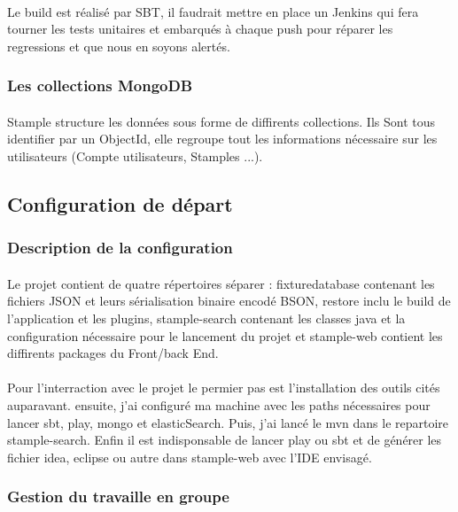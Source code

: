 \documentclass[11pt]{article} %
\begin{document}
\paragraph{}
Le build est réalisé par SBT, il faudrait mettre en place un Jenkins qui fera tourner les tests unitaires et embarqués à chaque push pour réparer les regressions et que nous en soyons alertés.
\subsubsection{Les collections MongoDB}
\paragraph{}
Stample structure les données sous forme de diffirents collections.
Ils Sont tous identifier par un ObjectId, elle regroupe tout les informations nécessaire sur les utilisateurs (Compte utilisateurs, Stamples ...).
\subsection{Configuration de départ}
\subsubsection{Description de la configuration}
\paragraph{}
Le projet contient de quatre répertoires séparer : fixturedatabase contenant les fichiers JSON et leurs sérialisation binaire encodé BSON, restore inclu le build de l'application et les plugins, stample-search contenant les classes java et la configuration nécessaire pour le lancement du projet et stample-web contient les diffirents packages du Front/back End.
\paragraph{}
Pour l'interraction avec le projet le permier pas est l'installation des outils cités auparavant. ensuite, j'ai configuré ma machine avec les paths nécessaires pour lancer sbt, play, mongo et elasticSearch. Puis, j'ai lancé le mvn dans le repartoire stample-search. Enfin il est indisponsable de lancer play ou sbt et de générer les fichier idea, eclipse ou autre dans stample-web avec l'IDE envisagé.     
\subsubsection{Gestion du travaille en groupe}
\end{document}
